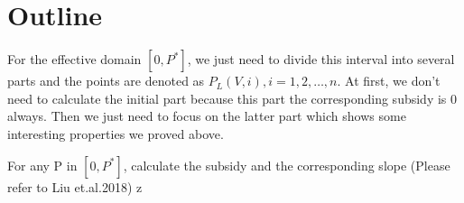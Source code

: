 \section{Outline}

For the effective domain $[0, P^*]$, we just need to divide this interval into several parts and the points are denoted as $P_L(V,i), i = 1,2,\ldots,n$.  At first, we don't need to calculate the initial part because this part the corresponding subsidy is 0 always. Then we just need to focus on the latter part which shows some interesting properties we proved above.

For any P in $[0, P^*]$, calculate the subsidy and the corresponding slope (Please refer to Liu et.al.2018) z       
